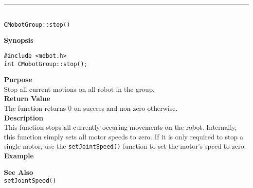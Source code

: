 \noindent
\vspace{5pt}
\rule{4.5in}{0.015in}\\
\noindent
{\LARGE \texttt{CMobotGroup::stop()}}\\
{}

\noindent
{\bf Synopsis}
\begin{verbatim}
#include <mobot.h>
int CMobotGroup::stop();
\end{verbatim}

\noindent
{\bf Purpose}\\
Stop all current motions on all robot in the group.\\

\noindent
{\bf Return Value}\\
The function returns 0 on success and non-zero otherwise.\\

\noindent
{\bf Description}\\
This function stops all currently occuring movements on the robot. Internally, this function simply sets all motor speeds to zero. If it is only required to stop a single motor, use the 
\texttt{setJointSpeed()} function to set the motor's speed to zero. \\

\noindent
{\bf Example}\\
\noindent

\noindent
{\bf See Also}\\
\texttt{setJointSpeed()}

